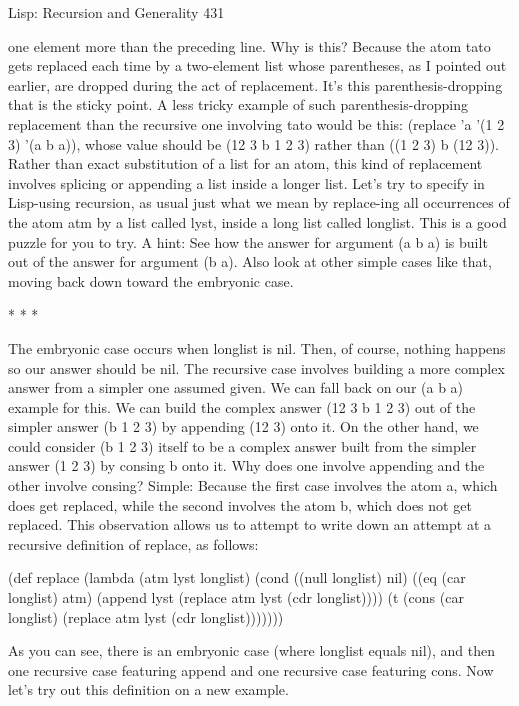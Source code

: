 Lisp: Recursion and Generality                                                         431

one element more than the preceding line. Why is this? Because the atom tato gets
replaced each time by a two-element list whose parentheses, as I pointed out earlier,
are dropped during the act of replacement. It's this parenthesis-dropping that is the
sticky point. A less tricky example of such parenthesis-dropping replacement than the
recursive one involving tato would be this: (replace 'a '(1 2 3) '(a b a)), whose value
should be (12 3 b 1 2 3) rather than ((1 2 3) b (12 3)). Rather than exact substitution
of a list for an atom, this kind of replacement involves splicing or appending a list
inside a longer list.
        Let's try to specify in Lisp-using recursion, as usual just what we mean by
replace-ing all occurrences of the atom atm by a list called lyst, inside a long list
called longlist. This is a good puzzle for you to try. A hint: See how the answer for
argument (a b a) is built out of the answer for argument (b a). Also look at other
simple cases like that, moving back down toward the embryonic case.

                                        *   *   *

       The embryonic case occurs when longlist is nil. Then, of course, nothing
happens so our answer should be nil.
       The recursive case involves building a more complex answer from a simpler
one assumed given. We can fall back on our (a b a) example for this. We can build
the complex answer (12 3 b 1 2 3) out of the simpler answer (b 1 2 3) by appending
(12 3) onto it. On the other hand, we could consider (b 1 2 3) itself to be a complex
answer built from the simpler answer (1 2 3) by consing b onto it. Why does one
involve appending and the other involve consing? Simple: Because the first case
involves the atom a, which does get replaced, while the second involves the atom b,
which does not get replaced. This observation allows us to attempt to write down an
attempt at a recursive definition of replace, as follows:

(def replace (lambda (atm lyst longlist)
       (cond ((null longlist) nil)
               ((eq (car longlist) atm)
               (append lyst (replace atm lyst (cdr longlist))))
               (t (cons (car longlist) (replace atm lyst (cdr longlist)))))))

As you can see, there is an embryonic case (where longlist equals nil), and then one
recursive case featuring append and one recursive case featuring cons. Now let's try
out this definition on a new example.

